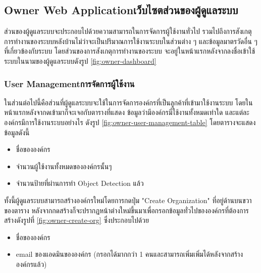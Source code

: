 \subsection{\ifenglish Owner Web Application\else เว็บไซตส่วนของผู้ดูแลระบบ\fi}
\ifenglish \else
ส่วนของผู้ดูแลระบบจะประกอบไปด้วยความสามารถในการจัดการผู้ใช้งานทั่วไป รวมไปถึงการสังเกตุการทำงานของระบบหลังบ้านไม่ว่าจะเป็นปริมาณการใช้งานระบบในส่วนต่าง ๆ และข้อมูลมาตรวัดอื่น ๆ ที่เกี่ยวข้องกับระบบ
โดยส่วนของการสังเกตุการทำงานของระบบ จะอยู่ในหน้าแรกหลังจากลงชื่อเข้าใช้ระบบในนามของผู้ดูแลระบบดังรูป \ref{fig:owner-dashboard}
\fi


\subsubsection{\ifenglish User Management\else การจัดการผู้ใช้งาน\fi}
\ifenglish \else
ในส่วนต่อไปนี้คือส่วนที่ผู้ดูแลระบบจะใช้ในการจัดการองค์กรที่เป็นลูกค้าที่เข้ามาใช้งานระบบ โดยในหน้าแรกหลังจากดเข้ามาก็จะเจอกับตารางที่แสดง ข้อมูลว่ามีองค์กรมี่ใช้งานทั้งหมดเท่าใด และแต่ละองค์กรมีการใช้งานระบบอย่างไร ดังรูป \ref{fig:owner-user-management-table} โดยตารางจะแสดงข้อมูลดังนี้ 
\begin{itemize}
    \item ชื่อขององค์กร
    \item จำนวนผู้ใช้งานทั้งหมดขององค์กรนั้นๆ
    \item จำนวนป้ายที่ผ่านการทำ Object Detection แล้ว
\end{itemize}

ทั้งนี้ผู้ดูแลระบบสามารถสร้างองค์กรใหม่โดยการกดปุ่ม "Create Organization" ที่อยู่ด้านบนขวาของตาราง หลังจากกดสร้างก็จะปรากฏหน้าต่างใหม่ขึ้นมาเพื่อกรอกข้อมูลทั่วไปขององค์กรที่ต้องการสร้างดังรูปที่ \ref{fig:owner-create-org} ซึ่งประกอบไปด้วย
\begin{itemize}
    \item ชื่อขององค์กร
    \item email ของแอดมินขององค์กร (กรอกได้มากกว่า 1 คนและสามารถเพิ่มเพิ่มได้หลังจากสร้างองค์กรแล้ว)
\end{itemize}
\fi


